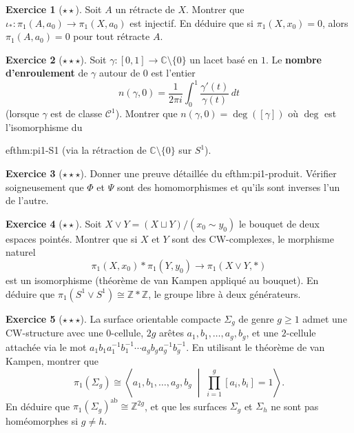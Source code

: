 \documentclass[12pt,a4paper,openany]{book}
\theoremstyle{definition}
\newtheorem{exercice}{Exercice}[chapter]
\theoremstyle{plain}
\theoremstyle{remark}
\newcommand{\Z}{\mathbb{Z}}
\newcommand{\C}{\mathbb{C}}
\begin{document}
\begin{exercice}[$\star\star$]\label{exo:pi1-retracte}
Soit $A$ un rétracte de $X$. Montrer que
$\iota_* : \pi_1(A, a_0) \to \pi_1(X, a_0)$ est injectif. En déduire que si
$\pi_1(X, x_0) = 0$, alors $\pi_1(A, a_0) = 0$ pour tout rétracte $A$.
\end{exercice}

\begin{exercice}[$\star\star\star$]\label{exo:pi1-cercle-winding}
Soit $\gamma : [0,1] \to \C \setminus \{0\}$ un lacet basé en $1$. Le
\textbf{nombre d'enroulement} de $\gamma$ autour de
$0$ est l'entier
\[
n(\gamma, 0) = \frac{1}{2\pi i} \int_0^1 \frac{\gamma'(t)}{\gamma(t)} \, dt
\]
(lorsque $\gamma$ est de classe $\mathcal{C}^1$). Montrer que
$n(\gamma, 0) = \deg([\gamma])$ où $\deg$ est l'isomorphisme du

ef{thm:pi1-S1} (via la rétraction de $\C \setminus \{0\}$ sur $S^1$).
\end{exercice}

\begin{exercice}[$\star\star\star$]\label{exo:pi1-produit-preuve}
Donner une preuve détaillée du 
ef{thm:pi1-produit}. Vérifier soigneusement
que $\Phi$ et $\Psi$ sont des homomorphismes et qu'ils sont inverses l'un de
l'autre.
\end{exercice}

\begin{exercice}[$\star\star$]\label{exo:pi1-bouquet}
Soit $X \vee Y = (X \sqcup Y) / (x_0 \sim y_0)$ le bouquet de deux espaces
pointés. Montrer que si $X$ et $Y$ sont des CW-complexes, le morphisme naturel
\[
\pi_1(X, x_0) * \pi_1(Y, y_0) \longrightarrow \pi_1(X \vee Y, *)
\]
est un isomorphisme (théorème de van Kampen appliqué au bouquet). En déduire que
$\pi_1(S^1 \vee S^1) \cong \Z * \Z$, le groupe libre à
deux générateurs.
\end{exercice}

\begin{exercice}[$\star\star\star$]\label{exo:lacet-surface-genre}
La surface orientable compacte $\Sigma_g$ de genre $g \geqslant 1$ admet une
CW-structure avec une $0$-cellule, $2g$ arêtes $a_1, b_1, \ldots, a_g, b_g$, et
une $2$-cellule attachée via le mot
$a_1 b_1 a_1^{-1} b_1^{-1} \cdots a_g b_g a_g^{-1} b_g^{-1}$.
En utilisant le théorème de van Kampen, montrer que
\[
\pi_1(\Sigma_g) \cong \left\langle a_1, b_1, \ldots, a_g, b_g \;\middle|\; \prod_{i=1}^g [a_i, b_i] = 1 \right\rangle.
\]
En déduire que $\pi_1(\Sigma_g)^{\mathrm{ab}} \cong \Z^{2g}$, et que les
surfaces $\Sigma_g$ et $\Sigma_h$ ne sont pas homéomorphes si $g \neq h$.
\end{exercice}
\end{document}

